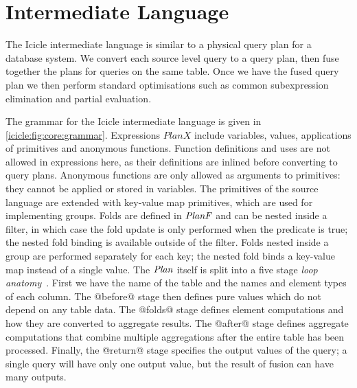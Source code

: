 \section{Intermediate Language}
\label{icicle:s:IcicleCore}

The Icicle intermediate language is similar to a physical query plan for a database system.
We convert each source level query to a query plan, then fuse together the plans for queries on the same table.
Once we have the fused query plan we then perform standard optimisations such as common subexpression elimination and partial evaluation.

The grammar for the Icicle intermediate language is given in \autoref{icicle:fig:core:grammar}.
Expressions $PlanX$ include variables, values, applications of primitives and anonymous functions.
Function definitions and uses are not allowed in expressions here, as their definitions are inlined before converting to query plans.
Anonymous functions are only allowed as arguments to primitives: they cannot be applied or stored in variables.
The primitives of the source language are extended with key-value map primitives, which are used for implementing groups.
Folds are defined in $\mathit{PlanF}$ and can be nested inside a filter, in which case the fold update is only performed when the predicate is true; the nested fold binding is available outside of the filter.
Folds nested inside a group are performed separately for each key; the nested fold binds a key-value map instead of a single value.
The $\mathit{Plan}$ itself is split into a five stage \emph{loop anatomy}~\cite{shivers2005anatomy}.
First we have the name of the table and the names and element types of each column.
The @before@ stage then defines pure values which do not depend on any table data.
The @folds@ stage defines element computations and how they are converted to aggregate results.
The @after@ stage defines aggregate computations that combine multiple aggregations after the entire table has been processed.
Finally, the @return@ stage specifies the output values of the query; a single query will have only one output value, but the result of fusion can have many outputs.

